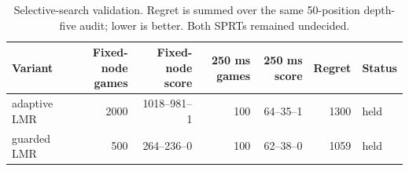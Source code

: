 \begin{table}[t]
\centering
\caption{Selective-search validation. Regret is summed over the same 50-position depth-five audit; lower is better. Both SPRTs remained undecided.}
\label{tab:selective-validation}
\scriptsize
\begin{tabular}{lrrr rrl}
\toprule
Variant & Fixed-node games & Fixed-node score & 250 ms games & 250 ms score & Regret & Status \\
\midrule
adaptive LMR & 2000 & 1018--981--1 & 100 & 64--35--1 & 1300 & held \\
guarded LMR & 500 & 264--236--0 & 100 & 62--38--0 & 1059 & held \\
\bottomrule
\end{tabular}
\end{table}
